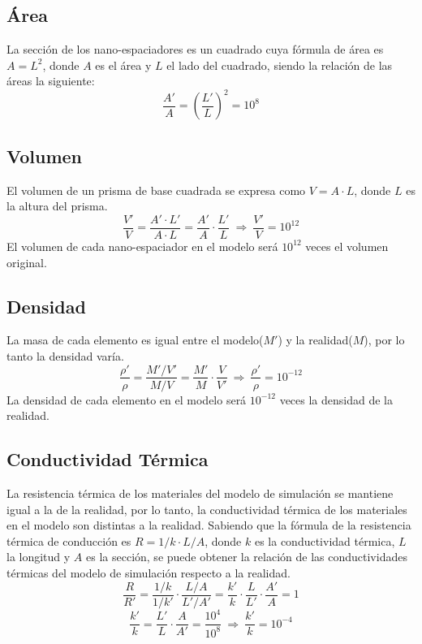 \subsection{Área}
La sección de los nano-espaciadores es un cuadrado cuya fórmula de área es $A=L^2$, donde $A$ es el área y $L$ el lado del cuadrado, siendo la relación de las áreas la siguiente:
\begin{equation}
	\dfrac{A'}{A}=\left(\dfrac{L'}{L}\right)^2=10^8
	\label{eq:relacion_areas}
\end{equation}
\subsection{Volumen}
El volumen de un prisma de base cuadrada se expresa como $V=A\cdot L$, donde $L$ es la altura del prisma.
\begin{equation}
	\dfrac{V'}{V}=\dfrac{A'\cdot L'}{A\cdot L} = 
	\dfrac{A'}{A}\cdot \dfrac{L'}{L} \ \Longrightarrow \ \dfrac{V'}{V} =10^{12}
	\label{eq:relacion_volumen}
\end{equation}
El volumen de cada nano-espaciador en el modelo será $10^{12}$ veces el volumen original.
\subsection{Densidad}
La masa de cada elemento es igual entre el modelo($M'$) y la realidad($M$), por lo tanto la densidad varía.
\begin{equation}
\dfrac{\rho '}{\rho}=\dfrac{M'/V'}{M/V}=\dfrac{M'}{M}\cdot \dfrac{V}{V'} \ \Longrightarrow \ 
\dfrac{\rho '}{\rho}=10^{-12}
\label{eq:relacion_densidad}
\end{equation}
La densidad de cada elemento en el modelo será $10^{-12}$ veces la densidad de la realidad.
\subsection{Conductividad Térmica}
La resistencia térmica de los materiales del modelo de simulación se mantiene igual a la de la realidad, por lo tanto, la conductividad térmica de los materiales en el modelo son distintas a la realidad. Sabiendo que la fórmula de la resistencia térmica de conducción es $R=1/k \cdot L/A$, donde $k$ es la conductividad térmica, $L$ la longitud y $A$ es la sección, se puede obtener la relación de las conductividades térmicas del modelo de simulación respecto a la realidad.
\[ \dfrac{R}{R'}= \dfrac{1/k}{1/k'}\cdot \dfrac{L/A}{L'/A'}= \dfrac{k'}{k}\cdot \dfrac{L}{L'}\cdot \dfrac{A'}{A}=1\]
\begin{equation}
\dfrac{k'}{k}=\dfrac{L'}{L}\cdot \dfrac{A}{A'}=\dfrac{10^4}{10^8} \ \Longrightarrow \ \dfrac{k'}{k}=10^{-4}
\label{eq:relacion_conductividadTermica}
\end{equation}

